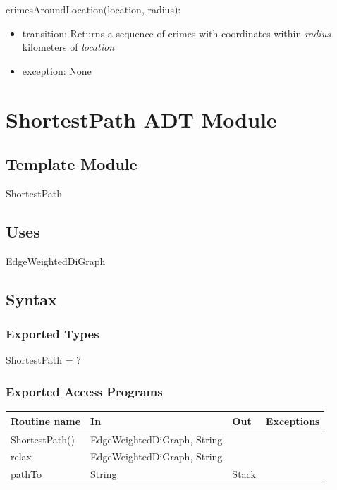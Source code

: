\documentclass[12pt]{article}
\begin{document}
\noindent crimesAroundLocation(location, radius):
\begin{itemize}
\item transition: \textnormal{\small{Returns a sequence of crimes with coordinates within \textit{radius} kilometers of \textit{location}}}
\item exception: None
\end{itemize}


\newpage

\section* {ShortestPath ADT Module}

\subsection*{Template Module}

ShortestPath

\subsection* {Uses}

EdgeWeightedDiGraph

\subsection* {Syntax}

\subsubsection* {Exported Types}

ShortestPath = ?

\subsubsection* {Exported Access Programs}

\begin{tabular}{| l | l | l | l |}
\hline
\textbf{Routine name} & \textbf{In} & \textbf{Out} & \textbf{Exceptions}\\
\hline
ShortestPath() & EdgeWeightedDiGraph, String & ~ & ~\\
\hline
relax & EdgeWeightedDiGraph, String & ~ & ~\\
\hline
pathTo & String & Stack & ~\\
\hline
\end{tabular}
\end{document}
